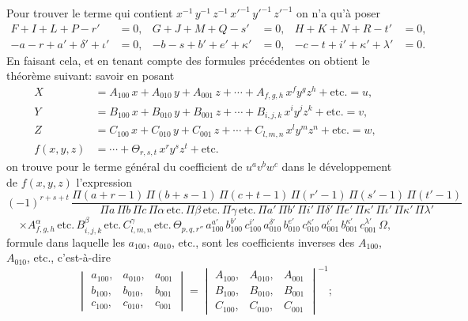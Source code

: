\documentclass[11pt,a4paper]{article}
\begin{document}
\setcounter{page}{58}

Pour trouver le terme qui contient $x^{-1}\,y^{-1}\,z^{-1}\,x'^{-1}\,y'^{-1}\,z'^{-1}$
on n'a qu'\`a poser
\begin{align*}
F + I + L + P - r' &= 0, & G + J + M + Q - s' &= 0, & H + K + N + R - t' &= 0,\\
-a - r + a' + \delta' + \iota' &= 0, & -b - s + b' + e' + \kappa' &= 0, & -c - t + i' + \kappa' + \lambda' &= 0.
\end{align*}
En faisant cela, et en tenant compte des formules pr\'ec\'edentes on obtient le
th\'eor\`eme suivant: savoir en posant
\begin{align*}
X &= A_{100}\,x + A_{010}\,y + A_{001}\,z + \cdots + A_{f,g,h}\,x^f y^g z^h + \text{etc.} = u,\\
Y &= B_{100}\,x + B_{010}\,y + B_{001}\,z + \cdots + B_{i,j,k}\,x^i y^j z^k + \text{etc.} = v,\\
Z &= C_{100}\,x + C_{010}\,y + C_{001}\,z + \cdots + C_{l,m,n}\,x^l y^m z^n + \text{etc.} = w,\\
f(x,y,z) &= \cdots + \Theta_{r,s,t}\,x^r y^s z^t + \text{etc.}
\end{align*}
on trouve pour le terme g\'en\'eral du coefficient de $u^a v^b w^c$ dans le
d\'eveloppement de $f(x,y,z)$ l'expression
\[
(-1)^{r+s+t}\,\frac{\Pi(a+r-1)\,\Pi(b+s-1)\,\Pi(c+t-1)\,\Pi(r'-1)\,\Pi(s'-1)\,\Pi(t'-1)}{\Pi a\,\Pi b\,\Pi c\,\Pi\alpha\,\text{etc.}\,\Pi\beta\,\text{etc.}\,\Pi\gamma\,\text{etc.}\,\Pi a'\,\Pi b'\,\Pi i'\,\Pi\delta'\,\Pi e'\,\Pi\kappa'\,\Pi\iota'\,\Pi\kappa'\,\Pi\lambda'}
\]
\[
\times A_{f,g,h}^{\alpha}\,\text{etc.}\,B_{i,j,k}^{\beta}\,\text{etc.}\,C_{l,m,n}^{\gamma}\,\text{etc.}\,\Theta_{p,q,r''}\,a_{100}^{a'}\,b_{100}^{b'}\,c_{100}^{i'}\,a_{010}^{\delta'}\,b_{010}^{e'}\,c_{010}^{\kappa'}\,a_{001}^{\iota'}\,b_{001}^{\kappa'}\,c_{001}^{\lambda'}\,\Omega,
\]
formule dans laquelle les $a_{100}$, $a_{010}$, etc., sont les coefficients
inverses des $A_{100}$, $A_{010}$, etc., c'est-\`a-dire
\[
\begin{vmatrix} a_{100}, & a_{010}, & a_{001} \\ b_{100}, & b_{010}, & b_{001} \\ c_{100}, & c_{010}, & c_{001} \end{vmatrix}
=
\begin{vmatrix} A_{100}, & A_{010}, & A_{001} \\ B_{100}, & B_{010}, & B_{001} \\ C_{100}, & C_{010}, & C_{001} \end{vmatrix}^{-1};
\]
\end{document}
